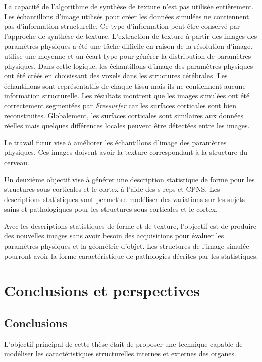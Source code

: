 La capacité de l'algorithme de synthèse de texture n'est pas utilisée entièrement. 
Les échantillons d'image utilisés pour créer les données simulées ne contiennent pas d'information structurelle. 
Ce type d'information peut être conservé par l'approche de synthèse de texture.
L'extraction de texture à partir des images des paramètres physiques a été une tâche difficile en raison de la résolution d'image.
\cite{CHAR-09} utilise une moyenne et un écart-type pour générer la distribution de paramètres physiques.
Dans cette logique, les échantillons d'image des paramètres physiques ont été créés en choisissant 
des voxels dans les structures cérébrales. 
Les échantillons sont représentatifs de chaque tissu mais ils ne contiennent aucune information structurelle.
Les résultats montrent que les images simulées ont été 
correctement segmentées par \textit{Freesurfer}
car les surfaces corticales sont bien reconstruites. 
Globalement, les surfaces corticales sont similaires aux données 
réelles mais quelques différences locales peuvent être détectées entre les images.

Le travail futur vise à améliorer les échantillons d'image des paramètres physiques. 
Ces images doivent avoir la texture correspondant à la structure du cerveau.

Un deuxième objectif vise à générer une description statistique de forme pour les structures sous-corticales et le cortex à l'aide des s-reps et CPNS.
Les descriptions statistiques vont permettre modéliser des variations sur les sujets sains et pathologiques pour les structures sous-corticales et le cortex.

Avec les descriptions statistiques de forme et de texture, l'objectif est de produire des nouvelles images sans avoir 
besoin des acquisitions pour évaluer les paramètres physiques et la géométrie d'objet. 
Les structures de l'image simulée pourront avoir la forme caractéristique de pathologies décrites par les statistiques.

\section{Conclusions et perspectives}
\label{sec:conclusionsfr}

\subsection{Conclusions}

L'objectif principal de cette thèse était de proposer une technique capable de modéliser 
les caractéristiques structurelles internes et externes des organes.

